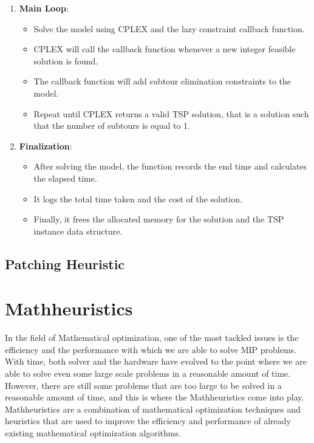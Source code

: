 \documentclass{article}
\begin{document}
\begin{enumerate}
\begin{lstlisting}[language=C]
	\end{lstlisting}
	\item \textbf{Main Loop}:
	\begin{itemize}
		\item Solve the model using CPLEX and the lazy constraint callback function.
		\item CPLEX will call the callback function whenever a new integer feasible solution is found.
		\item The callback function will add subtour elimination constraints to the model.
		\item Repeat until CPLEX returns a valid TSP solution, that is a solution such that the number of subtours is equal to 1.
	\end{itemize}
	\item \textbf{Finalization}:
	\begin{itemize}
		\item After solving the model, the function records the end time and calculates the elapsed time.
		\item It logs the total time taken and the cost of the solution.
		\item Finally, it frees the allocated memory for the solution and the TSP instance data structure.
	\end{itemize}
\end{enumerate}

\subsection{Patching Heuristic}

\newpage

\section{Mathheuristics}
In the field of Mathematical optimization, one of the most tackled issues is the efficiency and the performance with which
we are able to solve MIP problems. With time, both solver and the hardware have evolved to the point where we are able to solve even some large scale problems 
in a reasonable amount of time. However, there are still some problems that are too large to be solved in a reasonable amount of time, 
and this is where the Mathheuristics come into play. 
Mathheuristics are a combination of mathematical optimization techniques and heuristics that are used to improve the efficiency and performance of 
already existing mathematical optimization algorithms.\cite{Fischetti2003LocalBranching}\cite{Fischetti2016Matheuristics} \\
\end{document}
